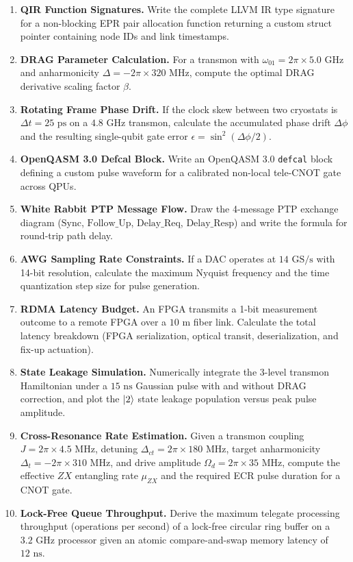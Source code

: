\begin{enumerate}[label=\textbf{12.\arabic*.}]
    \item \textbf{QIR Function Signatures.} Write the complete LLVM IR type signature for a non-blocking EPR pair allocation function returning a custom struct pointer containing node IDs and link timestamps.
    \item \textbf{DRAG Parameter Calculation.} For a transmon with $\omega_{01} = 2\pi \times 5.0\text{ GHz}$ and anharmonicity $\Delta = -2\pi \times 320\text{ MHz}$, compute the optimal DRAG derivative scaling factor $\beta$.
    \item \textbf{Rotating Frame Phase Drift.} If the clock skew between two cryostats is $\Delta t = 25\text{ ps}$ on a $4.8\text{ GHz}$ transmon, calculate the accumulated phase drift $\Delta \phi$ and the resulting single-qubit gate error $\epsilon = \sin^2(\Delta \phi / 2)$.
    \item \textbf{OpenQASM 3.0 Defcal Block.} Write an OpenQASM 3.0 \texttt{defcal} block defining a custom pulse waveform for a calibrated non-local tele-CNOT gate across QPUs.
    \item \textbf{White Rabbit PTP Message Flow.} Draw the 4-message PTP exchange diagram ($\text{Sync}$, $\text{Follow\_Up}$, $\text{Delay\_Req}$, $\text{Delay\_Resp}$) and write the formula for round-trip path delay.
    \item \textbf{AWG Sampling Rate Constraints.} If a DAC operates at $14\text{ GS/s}$ with 14-bit resolution, calculate the maximum Nyquist frequency and the time quantization step size for pulse generation.
    \item \textbf{RDMA Latency Budget.} An FPGA transmits a 1-bit measurement outcome to a remote FPGA over a $10\text{ m}$ fiber link. Calculate the total latency breakdown (FPGA serialization, optical transit, deserialization, and fix-up actuation).
    \item \textbf{State Leakage Simulation.} Numerically integrate the 3-level transmon Hamiltonian under a $15\text{ ns}$ Gaussian pulse with and without DRAG correction, and plot the $\ket{2}$ state leakage population versus peak pulse amplitude.
    \item \textbf{Cross-Resonance Rate Estimation.} Given a transmon coupling $J = 2\pi \times 4.5\text{ MHz}$, detuning $\Delta_{ct} = 2\pi \times 180\text{ MHz}$, target anharmonicity $\Delta_t = -2\pi \times 310\text{ MHz}$, and drive amplitude $\Omega_d = 2\pi \times 35\text{ MHz}$, compute the effective $ZX$ entangling rate $\mu_{ZX}$ and the required ECR pulse duration for a CNOT gate.
    \item \textbf{Lock-Free Queue Throughput.} Derive the maximum telegate processing throughput (operations per second) of a lock-free circular ring buffer on a $3.2\text{ GHz}$ processor given an atomic compare-and-swap memory latency of $12\text{ ns}$.
\end{enumerate}
